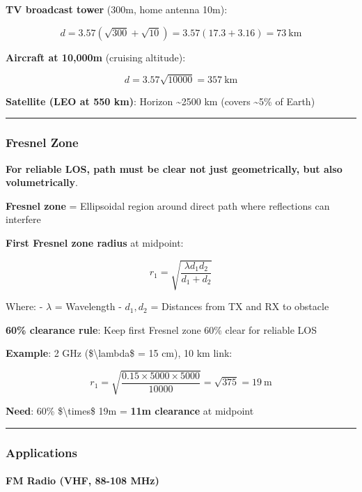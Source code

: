 \textbf{TV broadcast tower} (300m, home antenna 10m):

\[
d = 3.57(\sqrt{300} + \sqrt{10}) = 3.57(17.3 + 3.16) = 73\ \text{km}
\]

\textbf{Aircraft at 10,000m} (cruising altitude):

\[
d = 3.57 \sqrt{10000} = 357\ \text{km}
\]

\textbf{Satellite (LEO at 550 km)}: Horizon \textasciitilde2500 km
(covers \textasciitilde5\% of Earth)

\begin{center}\rule{0.5\linewidth}{0.5pt}\end{center}

\subsubsection{Fresnel Zone}\label{fresnel-zone}

\textbf{For reliable LOS, path must be clear not just geometrically, but
also volumetrically}.

\textbf{Fresnel zone} = Ellipsoidal region around direct path where
reflections can interfere

\textbf{First Fresnel zone radius} at midpoint:

\[
r_1 = \sqrt{\frac{\lambda d_1 d_2}{d_1 + d_2}}
\]

Where: - \(\lambda\) = Wavelength - \(d_1, d_2\) = Distances from TX and
RX to obstacle

\textbf{60\% clearance rule}: Keep first Fresnel zone 60\% clear for
reliable LOS

\textbf{Example}: 2 GHz (\$\textbackslash lambda\$ = 15 cm), 10 km link:

\[
r_1 = \sqrt{\frac{0.15 \times 5000 \times 5000}{10000}} = \sqrt{375} = 19\ \text{m}
\]

\textbf{Need}: 60\% \$\textbackslash times\$ 19m = \textbf{11m
clearance} at midpoint

\begin{center}\rule{0.5\linewidth}{0.5pt}\end{center}

\subsubsection{Applications}\label{applications-2}

\paragraph{FM Radio (VHF, 88-108 MHz)}\label{fm-radio-vhf-88-108-mhz}

